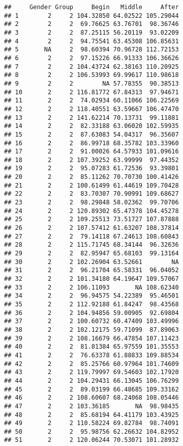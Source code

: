 \documentclass[
]{article}
\begin{document}
\begin{verbatim}
##     Gender Group     Begin   Middle     After
## 1        2     2 104.32850 64.02522 105.29044
## 2        2     2  69.76625 63.76701  98.36746
## 3        2     2  87.25115 56.20119  93.02209
## 4        2     2  94.75541 63.45308 106.85631
## 5       NA     2  98.60394 70.96728 112.72153
## 6        2     2  97.15226 66.91333 106.36626
## 7        2     2 104.43724 62.38163 110.20925
## 8        2     2 106.53993 69.99617 110.98618
## 9        2     2        NA 57.78355  90.38513
## 10       2     2 116.81772 67.84313  97.94671
## 11       2     2  74.02934 60.11066 106.22569
## 12       2     2 118.40551 63.59667 106.47470
## 13       2     2 141.62214 70.13731  99.11881
## 14       2     2  82.33188 63.06020 102.59935
## 15       2     2  87.63083 54.04317  96.35607
## 16       2     2  86.99718 68.35782 103.33960
## 17       2     2  91.00026 64.57933 101.09616
## 18       2     2 107.39252 63.99999  97.44352
## 19       2     2  95.07283 61.72536  93.39801
## 20       2     2  85.11262 70.70730 100.41426
## 21       2     2 100.61499 61.44619 109.70428
## 22       2     2  83.70307 70.90991 109.68627
## 23       2     2  98.29848 58.02362  99.70706
## 24       2     2 120.89302 65.47378 104.45278
## 25       2     2 109.25513 73.51727 107.87888
## 26       2     2 107.57412 61.63207 108.37814
## 27       2     2  79.14118 67.24613 108.60843
## 28       2     2 115.71745 68.34144  96.32636
## 29       2     2  82.95947 65.68103  99.13164
## 30       2     2 102.26904 63.52661        NA
## 31       2     2  96.21704 65.58331  96.04052
## 32       2     2 101.34180 64.19647 109.57067
## 33       2     2 106.11093       NA 108.62340
## 34       2     2  96.94575 54.22389  95.46501
## 35       2     2 112.92188 61.84247  98.43568
## 36       2     2 104.94856 59.00905  92.69804
## 37       2     2 100.60732 60.47409 103.49996
## 38       2     2 102.12175 59.71099  87.89063
## 39       2     2 108.16679 66.47854 107.11423
## 40       2     2  81.81384 65.97559 101.35553
## 41       2     2  76.63378 61.88833 109.88534
## 42       2     2  85.25766 60.97964 101.74609
## 43       2     2 119.79997 69.54603 102.17920
## 44       2     2 104.29431 66.13045 106.76299
## 45       2     2  89.03199 66.48685 109.33162
## 46       2     2 108.60607 68.24068 108.05446
## 47       2     2 103.36185       NA  98.98435
## 48       2     2  85.68194 64.41179 103.43925
## 49       2     2 110.58224 69.82784  98.74091
## 50       2     2  95.98756 62.26632 104.82952
## 51       2     2 120.06244 70.53071 101.28932

\end{verbatim}
\end{document}
